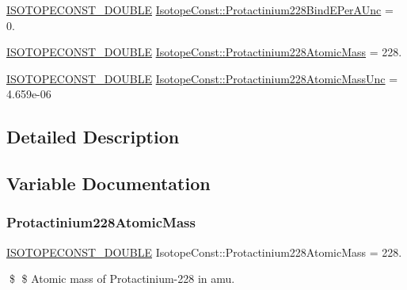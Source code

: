 \begin{DoxyCompactItemize}
\item 
\mbox{\hyperlink{group___isotope_const-_macros_ga8f45a7272ce02c0b4c65c44636ed719a}{I\+S\+O\+T\+O\+P\+E\+C\+O\+N\+S\+T\+\_\+\+D\+O\+U\+B\+LE}} \mbox{\hyperlink{group___isotope_const-_protactinium-_pa228_ga4802b679db646202db066ed22d7543ad}{Isotope\+Const\+::\+Protactinium228\+Bind\+E\+Per\+A\+Unc}} = 0.
\item 
\mbox{\hyperlink{group___isotope_const-_macros_ga8f45a7272ce02c0b4c65c44636ed719a}{I\+S\+O\+T\+O\+P\+E\+C\+O\+N\+S\+T\+\_\+\+D\+O\+U\+B\+LE}} \mbox{\hyperlink{group___isotope_const-_protactinium-_pa228_ga48d57d3ff1b8e552bc7092f23e692490}{Isotope\+Const\+::\+Protactinium228\+Atomic\+Mass}} = 228.
\item 
\mbox{\hyperlink{group___isotope_const-_macros_ga8f45a7272ce02c0b4c65c44636ed719a}{I\+S\+O\+T\+O\+P\+E\+C\+O\+N\+S\+T\+\_\+\+D\+O\+U\+B\+LE}} \mbox{\hyperlink{group___isotope_const-_protactinium-_pa228_ga5b140619290c580592d0c7e5170186c5}{Isotope\+Const\+::\+Protactinium228\+Atomic\+Mass\+Unc}} = 4.\+659e-\/06
\end{DoxyCompactItemize}


\subsection{Detailed Description}


\subsection{Variable Documentation}
\mbox{\label{group___isotope_const-_protactinium-_pa228_ga48d57d3ff1b8e552bc7092f23e692490}} 
\subsubsection{\texorpdfstring{Protactinium228\+Atomic\+Mass}{Protactinium228AtomicMass}}
{\footnotesize\ttfamily \mbox{\hyperlink{group___isotope_const-_macros_ga8f45a7272ce02c0b4c65c44636ed719a}{I\+S\+O\+T\+O\+P\+E\+C\+O\+N\+S\+T\+\_\+\+D\+O\+U\+B\+LE}} Isotope\+Const\+::\+Protactinium228\+Atomic\+Mass = 228.}

\$ \$ Atomic mass of Protactinium-\/228 in amu. \mbox{\label{group___isotope_const-_protactinium-_pa228_ga5b140619290c580592d0c7e5170186c5}} 
